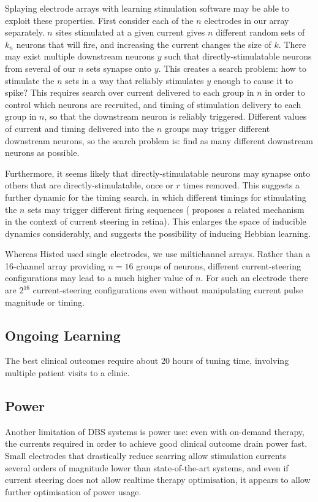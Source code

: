 \documentclass[10pt,letterpaper]{article}
\let\oldmarginpar\marginpar
\renewcommand{\marginpar}[1]{\oldmarginpar{\linespread{1}\scriptsize{#1}}}
\begin{document}
Splaying electrode arrays with learning stimulation software may be able to exploit these properties.  First consider each of the $n$ electrodes in our array separately.  $n$ sites stimulated at a given current gives $n$ different random sets of $k_n$ neurons that will fire, and increasing the current changes the size of $k$.  There may exist multiple downstream neurons $y$ such that directly-stimulatable neurons from several of our $n$ sets synapse onto $y$.  This creates a search problem: how to stimulate the $n$ sets in a way that reliably stimulates $y$ enough to cause it to spike?  This requires search over current delivered to each group in $n$ in order to control which neurons are recruited, and timing of stimulation delivery to each group in $n$, so that the downstream neuron is reliably triggered.  Different values of current and timing delivered into the $n$ groups may trigger different downstream neurons, so the search problem is: find as many different downstream neurons as possible.

Furthermore, it seems likely that directly-stimulatable neurons may synapse onto others that are directly-stimulatable, once or $r$ times removed.  This suggests a further dynamic for the timing search, in which different timings for stimulating the $n$ sets may trigger different firing sequences (\cite{Jepson2014steering_in_retina} proposes a related mechanism in the context of current steering in retina).  This enlarges the space of inducible dynamics considerably, and suggests the possibility of inducing Hebbian learning.

Whereas Histed used single electrodes, we use miltichannel arrays.  Rather than a 16-channel array providing $n=16$ groups of neurons, different current-steering configurations may lead to a much higher value of $n$.  For such an electrode there are $2^{16}$ current-steering configurations even without manipulating current pulse magnitude or timing.

\subsection{Ongoing Learning}

The best clinical outcomes require about 20 hours\marginpar{Now where did I read this\dots?} of tuning time, involving multiple patient visits to a clinic.

\subsection{Power}

Another limitation of DBS systems is power use: even with on-demand therapy, the currents required in order to achieve good clinical outcome drain power fast.  Small electrodes that drastically reduce scarring allow stimulation currents several orders of magnitude lower than state-of-the-art systems, and even if current steering does not allow realtime therapy optimisation, it appears to allow further optimisation of power usage.


\end{document}
